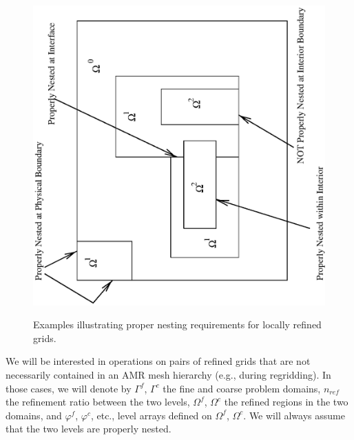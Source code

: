 \begin{figure}[htp]
{\includegraphics[type=eps,ext=.eps,read=.eps]{figs/propernest.req.2}
}
\caption{Examples illustrating proper nesting requirements for 
locally refined grids.}
\label{fig:basicAMRPic}
\end{figure}

We will be interested in operations on pairs of refined grids that
are not necessarily contained in an AMR mesh hierarchy (e.g., during
regridding). In those cases, we
will denote by $\Gamma^f$, $\Gamma^c$ the fine and coarse problem
domains, $n_{ref}$ the refinement ratio between the two levels, 
$\Omega^f$, $\Omega^c$ the refined regions in the two domains, and 
$\varphi^f$, $\varphi^c$, etc., level arrays defined on $\Omega^f$,
$\Omega^c$. We will always assume that the two levels are properly
nested.

